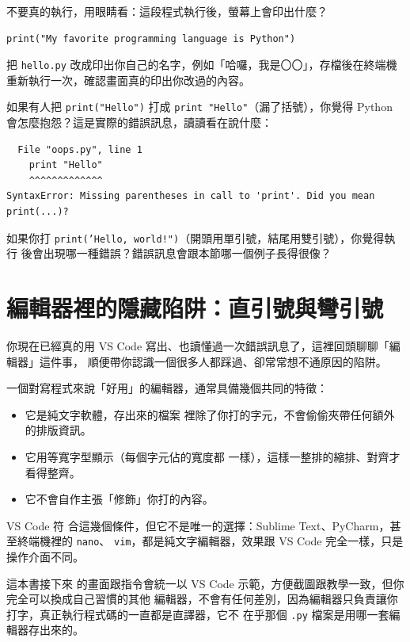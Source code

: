\begin{drills}[label=drills:hello-world]
\item 不要真的執行，用眼睛看：這段程式執行後，螢幕上會印出什麼？
\begin{verbatim}
print("My favorite programming language is Python")
\end{verbatim}
\item 把 \texttt{hello.py} 改成印出你自己的名字，例如「哈囉，我是〇〇」，存檔後在終端機
重新執行一次，確認畫面真的印出你改過的內容。
\item 如果有人把 \texttt{print("Hello")} 打成 \texttt{print "Hello"}（漏了括號），你覺得
Python 會怎麼抱怨？這是實際的錯誤訊息，讀讀看在說什麼：
\begin{verbatim}
  File "oops.py", line 1
    print "Hello"
    ^^^^^^^^^^^^^
SyntaxError: Missing parentheses in call to 'print'. Did you mean print(...)?
\end{verbatim}
\item 如果你打 \texttt{print('Hello, world!")}（開頭用單引號，結尾用雙引號），你覺得執行
後會出現哪一種錯誤？錯誤訊息會跟本節哪一個例子長得很像？
\end{drills}

\section{編輯器裡的隱藏陷阱：直引號與彎引號}
\label{sec:editor-pitfalls}

你現在已經真的用 VS Code 寫出、也讀懂過一次錯誤訊息了，這裡回頭聊聊「編輯器」這件事，
順便帶你認識一個很多人都踩過、卻常常想不通原因的陷阱。

一個對寫程式來說「好用」的編輯器，通常具備幾個共同的特徵：

\begin{itemize}
\item 它是純文字軟體，存出來的檔案
裡除了你打的字元，不會偷偷夾帶任何額外的排版資訊。
\item 它用等寬字型顯示（每個字元佔的寬度都
一樣），這樣一整排的縮排、對齊才看得整齊。
\item 它不會自作主張「修飾」你打的內容。
\end{itemize}

VS Code 符
合這幾個條件，但它不是唯一的選擇：Sublime Text、PyCharm，甚至終端機裡的 \texttt{nano}、
\texttt{vim}，都是純文字編輯器，效果跟 VS Code 完全一樣，只是操作介面不同。

這本書接下來
的畫面跟指令會統一以 VS Code 示範，方便截圖跟教學一致，但你完全可以換成自己習慣的其他
編輯器，不會有任何差別，因為編輯器只負責讓你打字，真正執行程式碼的一直都是直譯器，它不
在乎那個 \texttt{.py} 檔案是用哪一套編輯器存出來的。

